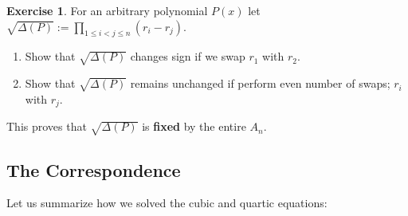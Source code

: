 \documentclass[reqno, 12pt, letter]{article}
\theoremstyle{plain}
\theoremstyle{definition}
\newtheorem{exercise}[theorem]{Exercise}
\theoremstyle{remark}
\numberwithin{equation}{section}
\begin{document}
		\begin{exercise}For an arbitrary polynomial $ P(x)$ let $\sqrt{\Delta(P)} := \prod_{1 \leq i < j \leq n} (r_i - r_j)$.
			\begin{enumerate} 
				\item Show that $ \sqrt{\Delta(P)}$ changes sign if we swap $ r_1$ with $ r_2$.
				\item Show that $ \sqrt{\Delta(P)}$ remains unchanged if perform even number of swaps; $ r_i$ with $ r_j$.
			\end{enumerate}
		This proves that $ \sqrt{\Delta(P)}$ is \textbf{fixed} by the entire $ A_n$.
		\end{exercise}	
			
		
		
		
		
		\newpage
		\subsection{The Correspondence}
		Let us summarize how we solved the cubic and quartic equations:		
\end{document}
